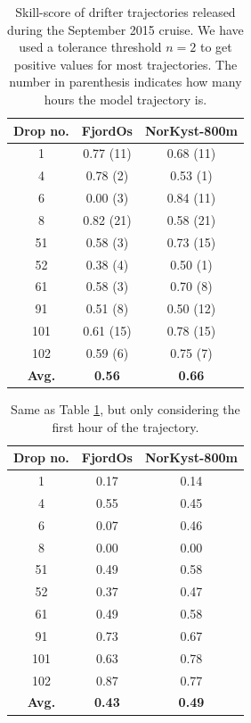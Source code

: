 \begin{table}
\begin{center}
  \begin{tabular}{ | c | c | c |}
    \hline
    {\bf Drop no.} & {\bf FjordOs} & {\bf NorKyst-800m} \\ \hline
    1 & 0.77 (11) & 0.68 (11) \\ 
    4 & 0.78 (2) & 0.53 (1) \\
    6 & 0.00 (3) & 0.84 (11) \\
    8 & 0.82 (21) & 0.58 (21) \\
    51 & 0.58 (3) & 0.73 (15) \\
    52 & 0.38 (4) & 0.50 (1) \\
    61 & 0.58 (3) & 0.70 (8) \\
    91 & 0.51 (8) & 0.50 (12) \\
    101 & 0.61 (15) & 0.78 (15) \\
    102 & 0.59 (6) & 0.75 (7) \\ \hline
    {\bf Avg.} & {\bf 0.56} & {\bf 0.66} \\
    \hline
  \end{tabular}
\caption{Skill-score of drifter trajectories released during the September 2015 cruise. We have used a tolerance threshold $n=2$ to get positive values for most trajectories. The number in parenthesis indicates how many hours the model trajectory is.}
\label{tab:skillscore_full}
\end{center}
\end{table}

\begin{table}
\begin{center}
  \begin{tabular}{ | c | c | c |}
    \hline
    {\bf Drop no.} & {\bf FjordOs} & {\bf NorKyst-800m} \\ \hline
    1 & 0.17 & 0.14 \\ 
    4 & 0.55 & 0.45 \\
    6 & 0.07 & 0.46 \\
    8 & 0.00 & 0.00 \\
    51 & 0.49 & 0.58 \\
    52 & 0.37 & 0.47 \\
    61 & 0.49 & 0.58 \\
    91 & 0.73 & 0.67 \\
    101 & 0.63 & 0.78 \\
    102 & 0.87 & 0.77 \\ \hline
    {\bf Avg.} & {\bf 0.43} & {\bf 0.49} \\
    \hline
  \end{tabular}
\caption{Same as Table \ref{tab:skillscore_full}, but only considering the first hour of the trajectory.}
\label{tab:skillscore_1hr}
\end{center}
\end{table}

